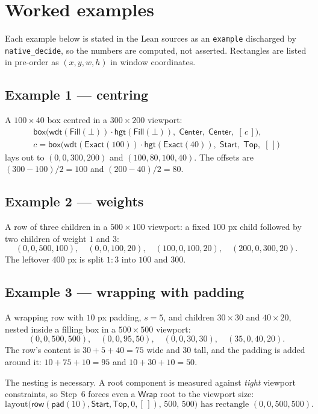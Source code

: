\documentclass[11pt,a4paper]{article}
\newcommand{\bo}{\bot}
\newcommand{\Exact}{\mathsf{Exact}}
\newcommand{\Fill}{\mathsf{Fill}}
\newcommand{\Wrap}{\mathsf{Wrap}}
\newcommand{\pad}{\mathsf{pad}}
\newcommand{\wdt}{\mathsf{wdt}}
\newcommand{\hgt}{\mathsf{hgt}}
\newcommand{\bbox}{\mathsf{box}}
\newcommand{\rrow}{\mathsf{row}}
\newcommand{\Start}{\mathsf{Start}}
\newcommand{\Center}{\mathsf{Center}}
\newcommand{\Top}{\mathsf{Top}}
\newcommand{\jv}[1]{\texttt{#1}}       %
\theoremstyle{definition}
\theoremstyle{plain}
\theoremstyle{remark}
\begin{document}
\section{Worked examples}
\label{app:examples}

Each example below is stated in the Lean sources as an \jv{example} discharged
by \jv{native\_decide}, so the numbers are computed, not asserted. Rectangles
are listed in pre-order as $(x, y, w, h)$ in window coordinates.

\subsection*{Example 1 --- centring}

A $100 \times 40$ box centred in a $300 \times 200$ viewport:
\[
  \begin{gathered}
    \bbox\bigl(\wdt(\Fill(\bo))\cdot\hgt(\Fill(\bo)),\; \Center,\; \Center,\; [\,c\,]\bigr), \\
    c = \bbox\bigl(\wdt(\Exact(100))\cdot\hgt(\Exact(40)),\; \Start,\; \Top,\; [\,]\bigr)
  \end{gathered}
\]
lays out to $(0,0,300,200)$ and $(100, 80, 100, 40)$. The offsets are
$(300-100)/2 = 100$ and $(200-40)/2 = 80$.

\subsection*{Example 2 --- weights}

A row of three children in a $500 \times 100$ viewport: a fixed $100$ px child
followed by two children of weight $1$ and $3$:
\[
  (0,0,500,100),\quad (0,0,100,20),\quad (100,0,100,20),\quad (200,0,300,20).
\]
The leftover $400$ px is split $1:3$ into $100$ and $300$.

\subsection*{Example 3 --- wrapping with padding}

A wrapping row with $10$ px padding, $s = 5$, and children $30\times30$ and
$40\times20$, nested inside a filling box in a $500\times500$ viewport:
\[
  (0,0,500,500),\quad (0,0,95,50),\quad (0,0,30,30),\quad (35,0,40,20).
\]
The row's content is $30 + 5 + 40 = 75$ wide and $30$ tall, and the padding is
added around it: $10 + 75 + 10 = 95$ and $10 + 30 + 10 = 50$.

The nesting is necessary. A root component is measured against \emph{tight}
viewport constraints, so Step~6 forces even a $\Wrap$ root to the viewport size:
\[
  \mathrm{layout}\bigl(\rrow(\pad(10), \Start, \Top, 0, [\,]),\, 500,\, 500\bigr)
    \text{ has rectangle } (0,0,500,500).
\]
\end{document}
